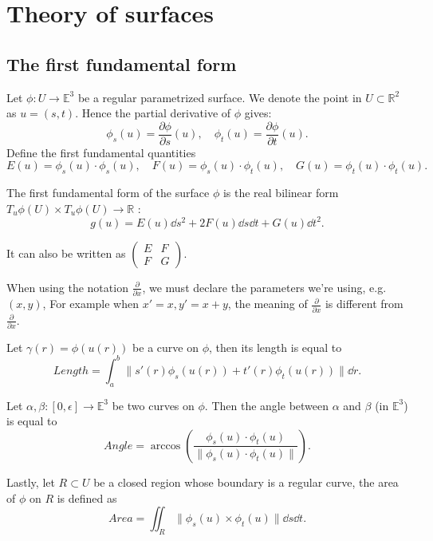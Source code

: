 \section{Theory of surfaces}
\label{sec:Theory of surfaces}

\subsection{The first fundamental form}
\label{sub:The first fundamental form}

Let $\phi: U\to \mathbb{E}^3$ be a regular parametrized surface.
We denote the point in $U \subset \mathbb{R}^2$ as $u=(s,t)$.
Hence the partial derivative of  $\phi$ gives:
 \[
\phi_s(u) = \frac{\partial\phi}{\partial s}(u),\quad
\phi_t(u) = \frac{\partial\phi}{\partial t}(u).
\]
Define the first fundamental quantities
\[
E(u) = \phi_s(u)\cdot \phi_s(u), \quad
F(u) = \phi_s(u)\cdot \phi_t(u), \quad
G(u) = \phi_t(u)\cdot \phi_t(u).
\]

The first fundamental form of the surface $\phi$ is the
real bilinear form $T_u\phi(U)\times T_u\phi(U)\to \mathbb{R}$ :
 \[
g(u) = E(u)\dd s^2 + 2F(u) \dd s \dd t + G(u)\dd t^2.
\]

It can also be written as $\begin{pmatrix}
	E &F\\ F &G
\end{pmatrix}$.

\begin{remark}
	When using the notation $\frac{\partial}{\partial x}$, we must
	declare the parameters we're using, e.g. $(x,y)$,
	For example when $x' = x, y' = x + y$, the meaning
	of $\frac{\partial}{\partial x}$ is different from
	$\frac{\partial}{\partial x}$.
\end{remark}

\begin{definition}
	Let $\gamma(r) = \phi(u(r))$ be a curve on $\phi$, then its length is equal to
	\[
	Length = \int_{a}^{b} \lVert s'(r)\phi_s(u(r))+t'(r)\phi_t(u(r)) \rVert \dd r.
	\]

	Let $\alpha,\beta: [0,\epsilon]\to \mathbb{E}^3$ be two curves on $\phi$.
	Then the angle between  $\alpha$ and  $\beta$ (in $\mathbb{E}^3$)
	is equal to
	\[
	Angle = \arccos \left( \frac{\phi_s(u)\cdot \phi_t(u)}{\lVert \phi_s(u)\cdot\phi_t(u) \rVert } \right).
	\]

	Lastly, let $R \subset U$ be a closed region whose boundary
	is a regular curve, the area of $\phi$ on  $R$ is defined as
	\[
	Area = \iint_R \lVert \phi_s(u)\times \phi_t(u) \rVert \dd s\dd t.
	\]
\end{definition}

